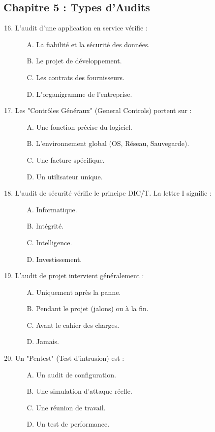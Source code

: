 \subsection*{Chapitre 5 : Types d'Audits}
\begin{enumerate}
    \setcounter{enumi}{15}
    \item L'audit d'une application en service vérifie :
    \begin{itemize} \item[A.] La fiabilité et la sécurité des données. \item[B.] Le projet de développement. \item[C.] Les contrats des fournisseurs. \item[D.] L'organigramme de l'entreprise. \end{itemize}
    \item Les "Contrôles Généraux" (General Controls) portent sur :
    \begin{itemize} \item[A.] Une fonction précise du logiciel. \item[B.] L'environnement global (OS, Réseau, Sauvegarde). \item[C.] Une facture spécifique. \item[D.] Un utilisateur unique. \end{itemize}
    \item L'audit de sécurité vérifie le principe DIC/T. La lettre I signifie :
    \begin{itemize} \item[A.] Informatique. \item[B.] Intégrité. \item[C.] Intelligence. \item[D.] Investissement. \end{itemize}
    \item L'audit de projet intervient généralement :
    \begin{itemize} \item[A.] Uniquement après la panne. \item[B.] Pendant le projet (jalons) ou à la fin. \item[C.] Avant le cahier des charges. \item[D.] Jamais. \end{itemize}
    \item Un "Pentest" (Test d'intrusion) est :
    \begin{itemize} \item[A.] Un audit de configuration. \item[B.] Une simulation d'attaque réelle. \item[C.] Une réunion de travail. \item[D.] Un test de performance. \end{itemize}
\end{enumerate}

